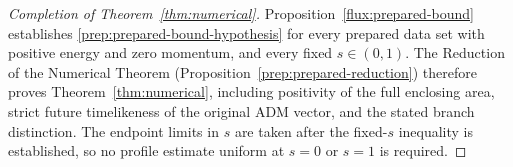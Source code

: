 \begin{proof}[Completion of Theorem~\ref{thm:numerical}]
Proposition~\ref{flux:prepared-bound} establishes
\eqref{prep:prepared-bound-hypothesis} for every prepared data set
with positive energy and zero momentum, and every fixed $s\in(0,1)$.
The Reduction of the Numerical Theorem
(Proposition~\ref{prep:prepared-reduction}) therefore proves
Theorem~\ref{thm:numerical}, including positivity of the full enclosing
area, strict future timelikeness of the original ADM vector, and the
stated branch distinction. The endpoint limits in $s$ are taken after
the fixed-$s$ inequality is established, so no profile estimate uniform
at $s=0$ or $s=1$ is required.
\end{proof}
